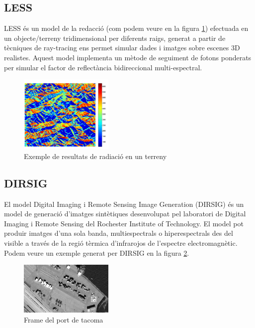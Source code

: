 \documentclass[10pt,a4paper,twocolumn,twoside]{article}
\begin{document}
\subsection{LESS}
LESS és un model de la redacció (com podem veure en la figura \ref{fig-lessradiacio}) efectuada en un objecte/terreny tridimensional per diferents raigs, generat a partir de tècniques de ray-tracing ens permet simular dades i imatges sobre escenes 3D realistes. Aquest model implementa un mètode de seguiment de fotons ponderats per simular el factor de reflectància bidireccional multi-espectral.

\begin{figure}[!h]
\centering
  	\includegraphics[width=0.4\textwidth]{lessradiacio}
	\caption{Exemple de resultats de radiació en un terreny}
	\label{fig-lessradiacio}
\end{figure}

\subsection{DIRSIG}

El model Digital Imaging i Remote Sensing Image Generation (DIRSIG) és un model de generació d'imatges sintètiques desenvolupat pel laboratori de Digital Imaging i Remote Sensing del Rochester Institute of Technology. El model pot produir imatges d'una sola banda, multiespectrals o hiperespectrals des del visible a través de la regió tèrmica d'infrarojos de l'espectre electromagnètic. Podem veure un exemple generat per DIRSIG en la figura \ref{fig-tacoma}.

\begin{figure}[!h]
\centering
  	\includegraphics[width=0.4\textwidth]{tacoma}
	\caption{Frame del port de tacoma}
	\label{fig-tacoma}
\end{figure}
\end{document}
